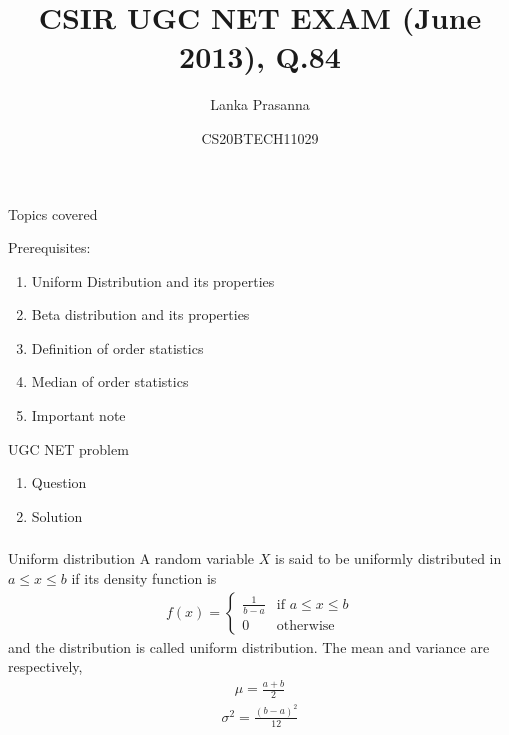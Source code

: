 \documentclass{beamer}
\title{CSIR UGC NET EXAM (June 2013), Q.84}
\author{Lanka Prasanna}
\date{CS20BTECH11029}
\begin{document}
\begin{frame}
\titlepage
\end{frame}
\begin{frame}{Topics covered}
\begin{block}{Prerequisites:}
\begin{enumerate}[]
\item Uniform Distribution and its properties
\item Beta distribution and its properties
\item Definition of order statistics
\item Median of order statistics
\item Important note
\end{enumerate}
\end{block}
\begin{block}{UGC NET problem}
\begin{enumerate}[]
 \item Question
\item Solution 
\end{enumerate}
\end{block}


\end{frame}
\begin{frame}
\frametitle{}
\begin{block}{Uniform distribution}
A random variable $X$ is said to be uniformly distributed in $a\leq x\leq b$ if its density function is
\begin{align}
    f(x)=
    \begin{cases}
    \frac{1}{b-a} & \text{if } a\leq x \leq b\\
    0 & \text{otherwise}
    \end{cases}\label{eq:1}
\end{align}
and the distribution is called uniform distribution.
The mean and variance are respectively,
\begin{align}
    \mu=\frac{a+b}{2}\label{eq:2}
\end{align}
\begin{align}
     \sigma^2=\frac{(b-a)^2}{12}\label{eq:3}
\end{align}
\label{theorem}

\end{block}
\end{frame}
\end{document}
